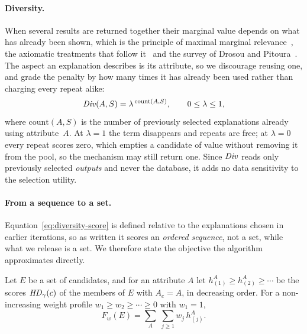 \paragraph{Diversity.}
When several results are returned together their marginal value depends on what has already been shown, which is the principle of maximal marginal relevance~\cite{MMR}, the axiomatic treatments that follow it~\cite{GollapudiS09,LinBilmes11} and the survey of Drosou and Pitoura~\cite{DrosouP10}.
The aspect an explanation describes is its attribute, so we discourage reusing one, and grade the penalty by how many times it has already been used rather than charging every repeat alike:
\begin{equation}
\mathit{Div}(A,S)=\lambda^{\,\mathrm{count}(A,S)},
\qquad 0\le\lambda\le1,
\label{eq:diversity-score}
\end{equation}
where $\mathrm{count}(A,S)$ is the number of previously selected explanations already using attribute~$A$.
At $\lambda=1$ the term disappears and repeats are free; at $\lambda=0$ every repeat scores zero, which empties a candidate of value without removing it from the pool, so the mechanism may still return one.
Since $\mathit{Div}$ reads only previously selected \emph{outputs} and never the database, it adds no data sensitivity to the selection utility.

\paragraph{From a sequence to a set.}
Equation~\eqref{eq:diversity-score} is defined relative to the explanations chosen in earlier iterations, so as written it scores an \emph{ordered sequence}, not a set, while what we release is a set.
We therefore state the objective the algorithm approximates directly.

\begin{definition}
\label{def:setobj}
Let $E$ be a set of candidates, and for an attribute $A$ let
$h^A_{(1)}\ge h^A_{(2)}\ge\cdots$ be the scores $\mathit{HD}_\gamma(c)$ of the members of $E$ with $A_c=A$, in decreasing order.
For a non-increasing weight profile $w_1\ge w_2\ge\cdots\ge0$ with $w_1=1$,
\begin{equation}
F_w(E)=\sum_{A}\;\sum_{j\ge1} w_j\, h^A_{(j)} .
\label{eq:set-objective}
\end{equation}
\end{definition}

